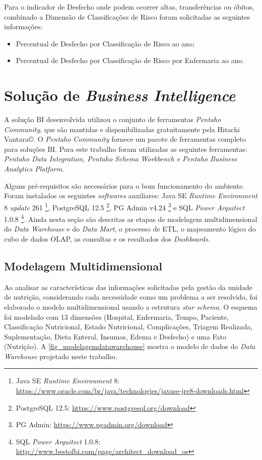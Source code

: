 Para o indicador de Desfecho onde podem ocorrer altas, transferências ou óbitos, combinado a Dimensão de Classificações de Risco foram solicitadas as seguintes informações:
\begin{itemize}
    \item Percentual de Desfecho por Classificação de Risco ao ano;
    \item Percentual de Desfecho por Classificação de Risco por Enfermaria ao ano.
\end{itemize}

\section{Solução de \textit{Business Intelligence}}

A solução BI desenvolvida utilizou o conjunto de ferramentas \textit{Pentaho Community}, que são mantidas e disponibilizadas gratuitamente pela Hitachi Vantara©. O \textit{Pentaho Community} fornece um pacote de ferramentas completo para soluções BI. Para este trabalho foram utilizadas as seguintes ferramentas: \textit{Pentaho Data Integration, Pentaho Schema Workbench e Pentaho Business Analytics Platform}.

Alguns pré-requisitos são necessários para o bom funcionamento do ambiente. Foram instalados os seguintes \textit{softwares} auxiliares: Java SE \textit{Runtime Environment} 8 \textit{update} 261 \footnote{Java SE \textit{Runtime Environment} 8: \url{https://www.oracle.com/br/java/technologies/javase-jre8-downloads.html}}, PostgreSQL 12.5 \footnote{PostgreSQL 12.5: \url{https://www.postgresql.org/download}}, PG Admin v4.24 \footnote{PG Admin: \url{https://www.pgadmin.org/download}} e SQL \textit{Power Arquitect} 1.0.8 \footnote{SQL \textit{Power Arquitect} 1.0.8: \url{http://www.bestofbi.com/page/architect_download_os}}. Ainda nesta seção são descritas as etapas de modelagem multidimensional do \textit{Data Warehouse} e do \textit{Data Mart}, o processo de ETL, o mapeamento lógico do cubo de dados OLAP, as consultas e os resultados dos \textit{Dashboards}.

\subsection{Modelagem Multidimensional}
Ao analisar as características das informações solicitadas pela gestão da unidade de nutrição, considerando cada necessidade como um problema a ser resolvido, foi elaborado o modelo multidimensional usando a estrutura \textit{star schema}. O esquema foi modelado com 13 dimensões (Hospital, Enfermaria, Tempo, Paciente, Classificação Nutricional, Estado Nutricional, Complicações, Triagem Realizada, Suplementação, Dieta Enteral, Insumos, Edema e Desfecho) e uma Fato (Nutrição). A \autoref{fig_modelagemdatawarehouse} mostra o modelo de dados do \textit{Data Warehouse} projetado neste trabalho.

